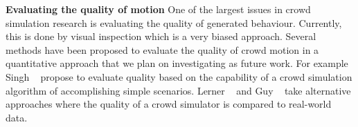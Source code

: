 \textbf{Evaluating the quality of motion}
One of the largest issues in crowd simulation research is evaluating the quality of generated behaviour.
Currently, this is done by visual inspection which is a very biased approach.
Several methods have been proposed to evaluate the quality of crowd motion in a quantitative approach that we plan on investigating as future work.
For example Singh \etal~\cite{Singh2009SteerBench} propose to evaluate quality based on the capability of a crowd simulation algorithm of accomplishing simple scenarios.
Lerner \etal~\cite{Lerner2010Context} and Guy \etal~\cite{Guy2012Statistical} take alternative approaches where the quality of a crowd simulator is compared to real-world data.

